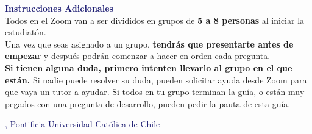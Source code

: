 \begin{coverpages}
\begin{flushleft}

        \vfill
        \vfill

        \textcolor{MidnightBlue}{\textbf{\large Instrucciones Adicionales}}\\

        Todos en el Zoom van a ser divididos en grupos de \textbf{5 a 8 personas} al iniciar la estudiatón.\\ Una vez que seas asignado a un grupo, \textbf{tendrás que presentarte antes de empezar} y después podrán comenzar a hacer en orden cada pregunta.\\[\baselineskip]

        \textbf{Si tienen alguna duda, primero intenten llevarlo al grupo en el que están.} Si nadie puede resolver su duda, pueden solicitar ayuda desde Zoom para que vaya un tutor a ayudar. Si todos en tu grupo terminan la guía, o están muy pegados con una pregunta de desarrollo, pueden pedir la pauta de esta guía.

        \vspace{8mm} \textcolor{MidnightBlue}{\small \unidadAcademica,  Pontificia Universidad Católica de Chile}
    \end{flushleft}
\end{coverpages}
\newpage

\siConRespuestas{\printanswers}{}